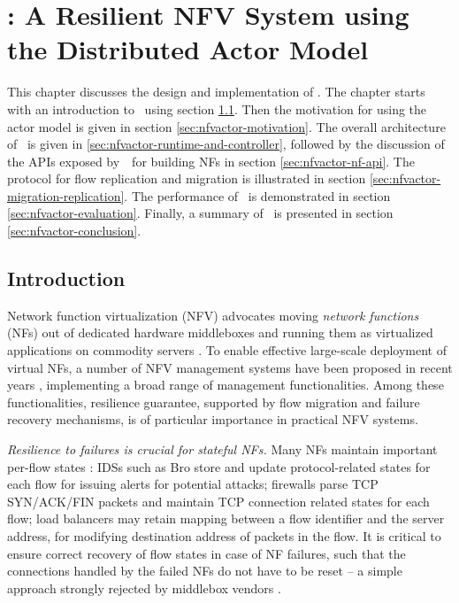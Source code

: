 \chapter {\nfactor: A Resilient NFV System using the Distributed Actor Model}
\label{ch:nfvactor}

This chapter discusses the design and implementation of \nfactor. The chapter starts with an introduction to \nfactor~using section \ref{sec:nfvactor-introduction}. Then the motivation for using the actor model is given in section \ref{sec:nfvactor-motivation}. The overall architecture of \nfactor~is given in \ref{sec:nfvactor-runtime-and-controller}, followed by the discussion of the APIs exposed by~\nfactor~for building NFs in section \ref{sec:nfvactor-nf-api}. The protocol for flow replication and migration is illustrated in section \ref{sec:nfvactor-migration-replication}. The performance of \nfactor~is demonstrated in section \ref{sec:nfvactor-evaluation}. Finally, a summary of \nfactor~is presented in section \ref{sec:nfvactor-conclusion}.

\section{Introduction}
\label{sec:nfvactor-introduction}

Network function virtualization (NFV) advocates moving
{\em network functions} (NFs) out of dedicated hardware middleboxes and running them as virtualized applications on commodity servers \cite{nfv-white-paper}. To enable effective large-scale deployment of virtual NFs, a number of NFV management systems have been proposed in recent years \cite{palkar2015e2, OpenBox, sekar2012design, anderson2012xomb, gember2012stratos, zhang2016opennetvm}, implementing a broad range of management functionalities. Among these functionalities, resilience guarantee, supported by flow migration and failure recovery mechanisms, is of particular importance in practical NFV systems.


{\em Resilience to failures \cite{sherry2015rollback,rajagopalan2013pico} is crucial for stateful NFs.}  Many NFs maintain important per-flow states \cite{EnablingNF}: IDSs such as Bro \cite{bro} store and update protocol-related states for each flow for issuing alerts for potential attacks; firewalls \cite{firewall} parse TCP SYN/ACK/FIN packets and maintain TCP connection related states for each flow; load balancers \cite{lvs} may retain mapping between a flow identifier and the server address, for modifying destination address of packets in the flow. It is critical to ensure correct recovery of flow states in case of NF failures, such that the connections handled by the failed NFs do not have to be reset -- a simple approach strongly rejected by middlebox vendors \cite{sherry2015rollback}.

